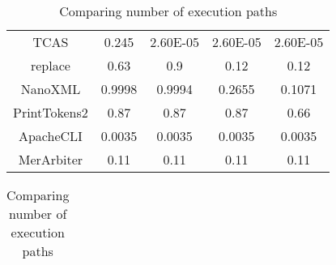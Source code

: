 \begin{table}
\begin{subtable}[t]{0.50\textwidth}
\begin{tabular}{@{}ccccc@{}}
                TCAS                                                     & 0.245                                                            & 2.60E-05                                                         & 2.60E-05                                                       & 2.60E-05                                                 \\
                replace                                                  & 0.63                                                             & 0.9                                                              & 0.12                                                           & 0.12                                                     \\
                NanoXML                                                  & 0.9998                                                           & 0.9994                                                           & 0.2655                                                         & 0.1071                                                   \\
                PrintTokens2                                             & 0.87                                                             & 0.87                                                             & 0.87                                                           & 0.66                                                     \\
                ApacheCLI                                                & 0.0035                                                           & 0.0035                                                           & 0.0035                                                         & 0.0035                                                   \\
                MerArbiter                                               & 0.11                                                             & 0.11                                                             & 0.11                                                           & 0.11                                                     \\ \bottomrule
            \end{tabular}
        \caption{Comparing number of execution paths}
        \label{table:numpaths-comparison}
    \end{subtable}
    \begin{subtable}[t]{0.50\textwidth}
        \centering
            \begin{tabular}{@{}ccccc@{}}

\end{tabular}
\end{subtable}
\end{table}
